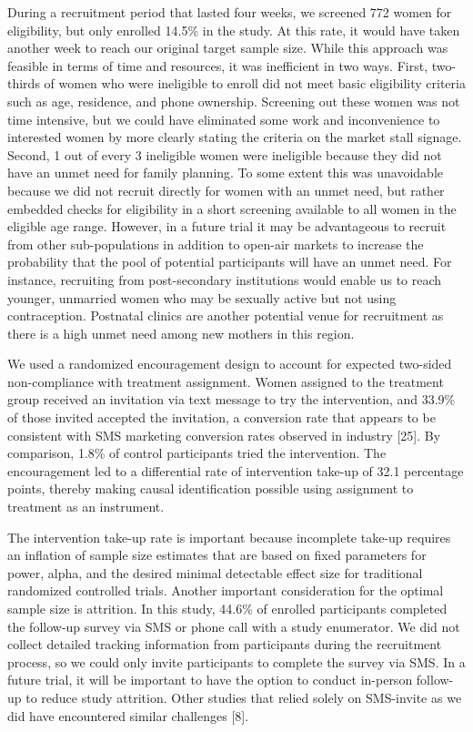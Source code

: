 \documentclass[man]{apa6}
\theoremstyle{definition}
\theoremstyle{definition}
\theoremstyle{definition}
\theoremstyle{remark}
\begin{document}
During a recruitment period that lasted four weeks, we screened 772
women for eligibility, but only enrolled 14.5\% in the study. At this
rate, it would have taken another week to reach our original target
sample size. While this approach was feasible in terms of time and
resources, it was inefficient in two ways. First, two-thirds of women
who were ineligible to enroll did not meet basic eligibility criteria
such as age, residence, and phone ownership. Screening out these women
was not time intensive, but we could have eliminated some work and
inconvenience to interested women by more clearly stating the criteria
on the market stall signage. Second, 1 out of every 3 ineligible women
were ineligible because they did not have an unmet need for family
planning. To some extent this was unavoidable because we did not recruit
directly for women with an unmet need, but rather embedded checks for
eligibility in a short screening available to all women in the eligible
age range. However, in a future trial it may be advantageous to recruit
from other sub-populations in addition to open-air markets to increase
the probability that the pool of potential participants will have an
unmet need. For instance, recruiting from post-secondary institutions
would enable us to reach younger, unmarried women who may be sexually
active but not using contraception. Postnatal clinics are another
potential venue for recruitment as there is a high unmet need among new
mothers in this region.

We used a randomized encouragement design to account for expected
two-sided non-compliance with treatment assignment. Women assigned to
the treatment group received an invitation via text message to try the
intervention, and 33.9\% of those invited accepted the invitation, a
conversion rate that appears to be consistent with SMS marketing
conversion rates observed in industry {[}25{]}. By comparison, 1.8\% of
control participants tried the intervention. The encouragement led to a
differential rate of intervention take-up of 32.1 percentage points,
thereby making causal identification possible using assignment to
treatment as an instrument.

The intervention take-up rate is important because incomplete take-up
requires an inflation of sample size estimates that are based on fixed
parameters for power, alpha, and the desired minimal detectable effect
size for traditional randomized controlled trials. Another important
consideration for the optimal sample size is attrition. In this study,
44.6\% of enrolled participants completed the follow-up survey via SMS
or phone call with a study enumerator. We did not collect detailed
tracking information from participants during the recruitment process,
so we could only invite participants to complete the survey via SMS. In
a future trial, it will be important to have the option to conduct
in-person follow-up to reduce study attrition. Other studies that relied
solely on SMS-invite as we did have encountered similar challenges
{[}8{]}.
\end{document}
